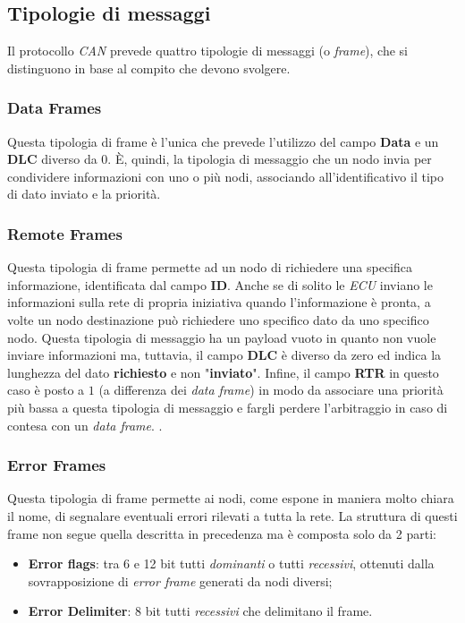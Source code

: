 \subsection{Tipologie di messaggi}
Il protocollo \emph{CAN} prevede quattro tipologie di messaggi (o \emph{frame}), che si distinguono in base al compito che devono svolgere.
\subsubsection{Data Frames}
Questa tipologia di frame è l'unica che prevede l'utilizzo del campo \textbf{Data} e un \textbf{DLC} diverso da 0. È, quindi, la tipologia di messaggio che un nodo invia per condividere informazioni con uno o più nodi, associando all'identificativo il tipo di dato inviato e la priorità.

\subsubsection{Remote Frames}
Questa tipologia di frame permette ad un nodo di richiedere una specifica informazione, identificata dal campo \textbf{ID}. Anche se di solito le \emph{ECU} inviano le informazioni sulla rete di propria iniziativa quando l'informazione è pronta, a volte un nodo destinazione può richiedere uno specifico dato da uno specifico nodo. Questa tipologia di messaggio ha un payload vuoto in quanto non vuole inviare informazioni ma, tuttavia, il campo \textbf{DLC} è diverso da zero ed indica la lunghezza del dato \textbf{richiesto} e non "\textbf{inviato}". Infine, il campo \textbf{RTR} in questo caso è posto a $1$ (a differenza dei \emph{data frame}) in modo da associare una priorità più bassa a questa tipologia di messaggio e fargli perdere l'arbitraggio in caso di contesa con un \emph{data frame}. \cite{wikipedia_canbus}.

\subsubsection{Error Frames}
Questa tipologia di frame permette ai nodi, come espone in maniera molto chiara il nome, di segnalare eventuali errori rilevati a tutta la rete. La struttura di questi frame non segue quella descritta in precedenza ma è composta solo da 2 parti:
\begin{itemize}
    \item \textbf{Error flags}: tra 6 e 12 bit tutti \emph{dominanti} o tutti \emph{recessivi}, ottenuti dalla sovrapposizione di \emph{error frame} generati da nodi diversi;
    \item \textbf{Error Delimiter}: 8 bit tutti \emph{recessivi} che delimitano il frame.
\end{itemize}

